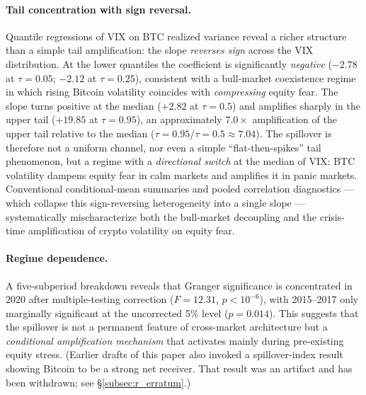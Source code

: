 \documentclass[11pt,a4paper]{article}
\begin{document}
\paragraph{Tail concentration with sign reversal.} Quantile regressions of VIX on BTC realized variance reveal a richer structure than a simple tail amplification: the slope \emph{reverses sign} across the VIX distribution. At the lower quantiles the coefficient is significantly \emph{negative} ($-2.78$ at $\tau = 0.05$; $-2.12$ at $\tau = 0.25$), consistent with a bull-market coexistence regime in which rising Bitcoin volatility coincides with \emph{compressing} equity fear. The slope turns positive at the median ($+2.82$ at $\tau = 0.5$) and amplifies sharply in the upper tail ($+19.85$ at $\tau = 0.95$), an approximately $7.0\times$ amplification of the upper tail relative to the median ($\tau = 0.95 / \tau = 0.5 \approx 7.04$).%
The spillover is therefore not a uniform channel, nor even a simple ``flat-then-spikes'' tail phenomenon, but a regime with a \emph{directional switch} at the median of VIX: BTC volatility dampens equity fear in calm markets and amplifies it in panic markets. Conventional conditional-mean summaries and pooled correlation diagnostics --- which collapse this sign-reversing heterogeneity into a single slope --- systematically mischaracterize both the bull-market decoupling and the crisis-time amplification of crypto volatility on equity fear.

\paragraph{Regime dependence.} A five-subperiod breakdown reveals that Granger significance is concentrated in 2020 after multiple-testing correction ($F = 12.31$, $p < 10^{-6}$), with 2015--2017 only marginally significant at the uncorrected 5\% level ($p = 0.014$). This suggests that the spillover is not a permanent feature of cross-market architecture but a \emph{conditional amplification mechanism} that activates mainly during pre-existing equity stress. (Earlier drafts of this paper also invoked a \citet{diebold2012} spillover-index result showing Bitcoin to be a strong net receiver. That result was an artifact and has been withdrawn; see \S\ref{subsec:r_erratum}.)
\end{document}
